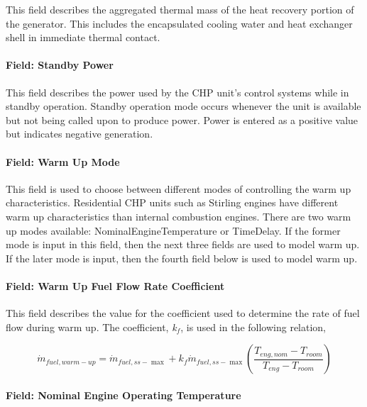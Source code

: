 This field describes the aggregated thermal mass of the heat recovery portion of the generator. This includes the encapsulated cooling water and heat exchanger shell in immediate thermal contact.

\paragraph{Field: Standby Power}\label{field-standby-power-1}

This field describes the power used by the CHP unit's control systems while in standby operation. Standby operation mode occurs whenever the unit is available but not being called upon to produce power. Power is entered as a positive value but indicates negative generation.

\paragraph{Field: Warm Up Mode}\label{field-warm-up-mode}

This field is used to choose between different modes of controlling the warm up characteristics. Residential CHP units such as Stirling engines have different warm up characteristics than internal combustion engines. There are two warm up modes available: NominalEngineTemperature or TimeDelay. If the former mode is input in this field, then the next three fields are used to model warm up. If the later mode is input, then the fourth field below is used to model warm up.

\paragraph{Field: Warm Up Fuel Flow Rate Coefficient}\label{field-warm-up-fuel-flow-rate-coefficient}

This field describes the value for the coefficient used to determine the rate of fuel flow during warm up. The coefficient, \emph{k\(_{f}\)}, is used in the following relation,

\begin{equation}
{\dot m_{fuel,warm - up}} = {\dot m_{fuel,ss - \max }} + {k_f}{\dot m_{fuel,ss - \max }}\left( {\frac{{{T_{eng,nom}} - {T_{room}}}}{{{T_{eng}} - {T_{room}}}}} \right)
\end{equation}

\paragraph{Field: Nominal Engine Operating Temperature}\label{field-nominal-engine-operating-temperature}

